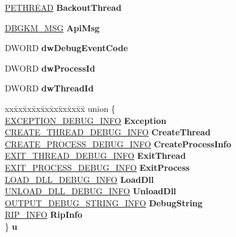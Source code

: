 \begin{DoxyCompactItemize}
\mbox{\label{struct___d_e_b_u_g___e_v_e_n_t_a39fa07cf430682126f48ab8322b6a6d4}} 
\hyperlink{struct___e_t_h_r_e_a_d}{P\+E\+T\+H\+R\+E\+AD} {\bfseries Backout\+Thread}
\item 
\mbox{\label{struct___d_e_b_u_g___e_v_e_n_t_a5a455789a58a075247f9073d02231645}} 
\hyperlink{struct___d_b_g_k_m___m_s_g}{D\+B\+G\+K\+M\+\_\+\+M\+SG} {\bfseries Api\+Msg}
\item 
\mbox{\label{struct___d_e_b_u_g___e_v_e_n_t_a766b0bddb3a2ed08412af0ab810fc3a4}} 
D\+W\+O\+RD {\bfseries dw\+Debug\+Event\+Code}
\item 
\mbox{\label{struct___d_e_b_u_g___e_v_e_n_t_ab59180a185a93c52fe627139a7967a14}} 
D\+W\+O\+RD {\bfseries dw\+Process\+Id}
\item 
\mbox{\label{struct___d_e_b_u_g___e_v_e_n_t_a957c4c348d9b7e3ecce058d86fbcc2e2}} 
D\+W\+O\+RD {\bfseries dw\+Thread\+Id}
\item 
\mbox{\label{struct___d_e_b_u_g___e_v_e_n_t_af1f3139acfe328a1be3eaf847a746709}} 
\begin{tabbing}
xx\=xx\=xx\=xx\=xx\=xx\=xx\=xx\=xx\=\kill
union \{\\
\>\hyperlink{struct___e_x_c_e_p_t_i_o_n___d_e_b_u_g___i_n_f_o}{EXCEPTION\_DEBUG\_INFO} {\bfseries Exception}\\
\>\hyperlink{struct___c_r_e_a_t_e___t_h_r_e_a_d___d_e_b_u_g___i_n_f_o}{CREATE\_THREAD\_DEBUG\_INFO} {\bfseries CreateThread}\\
\>\hyperlink{struct___c_r_e_a_t_e___p_r_o_c_e_s_s___d_e_b_u_g___i_n_f_o}{CREATE\_PROCESS\_DEBUG\_INFO} {\bfseries CreateProcessInfo}\\
\>\hyperlink{struct___e_x_i_t___t_h_r_e_a_d___d_e_b_u_g___i_n_f_o}{EXIT\_THREAD\_DEBUG\_INFO} {\bfseries ExitThread}\\
\>\hyperlink{struct___e_x_i_t___p_r_o_c_e_s_s___d_e_b_u_g___i_n_f_o}{EXIT\_PROCESS\_DEBUG\_INFO} {\bfseries ExitProcess}\\
\>\hyperlink{struct___l_o_a_d___d_l_l___d_e_b_u_g___i_n_f_o}{LOAD\_DLL\_DEBUG\_INFO} {\bfseries LoadDll}\\
\>\hyperlink{struct___u_n_l_o_a_d___d_l_l___d_e_b_u_g___i_n_f_o}{UNLOAD\_DLL\_DEBUG\_INFO} {\bfseries UnloadDll}\\
\>\hyperlink{struct___o_u_t_p_u_t___d_e_b_u_g___s_t_r_i_n_g___i_n_f_o}{OUTPUT\_DEBUG\_STRING\_INFO} {\bfseries DebugString}\\
\>\hyperlink{struct___r_i_p___i_n_f_o}{RIP\_INFO} {\bfseries RipInfo}\\
\} {\bfseries u}\\

\end{tabbing}\end{DoxyCompactItemize}


